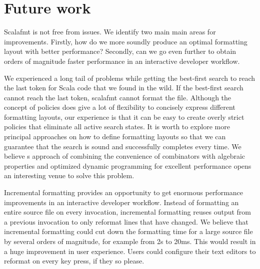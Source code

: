 \section{Future work}
Scalafmt is not free from issues.
We identify two main main areas for improvements.
Firstly, how do we more soundly produce an optimal formatting layout with better performance?
Secondly, can we go even further to obtain orders of magnitude faster performance in an interactive developer workflow.

We experienced a long tail of problems while getting the best-first search to reach the last token for Scala code that we found in the wild.
If the best-first search cannot reach the last token, scalafmt cannot format the file.
Although the concept of policies does give a lot of flexibility to concisely express different formatting layouts, our experience is that it can be easy to create overly strict policies that eliminate all active search states.
It is worth to explore more principal approaches on how to define formatting layouts so that we can guarantee that the search is sound and successfully completes every time.
We believe \rfmt{}s approach of combining the convenience of combinators with algebraic properties and optimized dynamic programming for excellent performance opens an interesting venue to solve this problem.

Incremental formatting provides an opportunity to get enormous performance improvements in an interactive developer workflow.
Instead of formatting an entire source file on every invocation, incremental formatting reuses output from a previous invocation to only reformat lines that have changed.
We believe that incremental formatting could cut down the formatting time for a large source file by several orders of magnitude, for example from 2s to 20ms.
This would result in a huge improvement in user experience.
Users could configure their text editors to reformat on every key press, if they so please.

